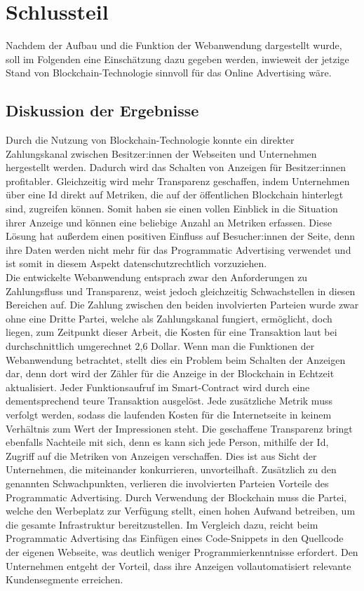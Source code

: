 \chapter{Schlussteil}
Nachdem der Aufbau und die Funktion der Webanwendung dargestellt wurde, soll im Folgenden eine Einschätzung dazu gegeben werden, inwieweit der jetzige Stand von Blockchain-Technologie sinnvoll für das Online Advertising wäre.
\section{Diskussion der Ergebnisse}
Durch die Nutzung von Blockchain-Technologie konnte ein direkter Zahlungskanal zwischen Besitzer:innen der Webseiten und Unternehmen hergestellt werden. Dadurch wird das Schalten von Anzeigen für Besitzer:innen profitabler. Gleichzeitig wird mehr Transparenz geschaffen, indem Unternehmen über eine Id direkt auf Metriken, die auf der öffentlichen Blockchain hinterlegt sind, zugreifen können. Somit haben sie einen vollen Einblick in die Situation ihrer Anzeige und können eine beliebige Anzahl an Metriken erfassen. Diese Lösung hat außerdem einen positiven Einfluss auf Besucher:innen der Seite, denn ihre Daten werden nicht mehr für das Programmatic Advertising verwendet und ist somit in diesem Aspekt datenschutzrechtlich vorzuziehen.\\

Die entwickelte Webanwendung entsprach zwar den Anforderungen zu Zahlungsfluss und Transparenz, weist jedoch gleichzeitig Schwachstellen in diesen Bereichen auf. Die Zahlung zwischen den beiden involvierten Parteien wurde zwar ohne eine Dritte Partei, welche als Zahlungskanal fungiert, ermöglicht, doch liegen, zum Zeitpunkt dieser Arbeit, die Kosten für eine Transaktion laut \cite{etherscan_2021} bei durchschnittlich umgerechnet 2,6 Dollar. Wenn man die Funktionen der Webanwendung betrachtet, stellt dies ein Problem beim Schalten der Anzeigen dar, denn dort wird der Zähler für die Anzeige in der Blockchain in Echtzeit aktualisiert. Jeder Funktionsaufruf im Smart-Contract wird durch eine dementsprechend teure Transaktion ausgelöst. Jede zusätzliche Metrik muss verfolgt werden, sodass die laufenden Kosten für die Internetseite in keinem Verhältnis zum Wert der Impressionen steht. 
Die geschaffene Transparenz bringt ebenfalls Nachteile mit sich, denn es kann sich jede Person, mithilfe der Id, Zugriff auf die Metriken von Anzeigen verschaffen. Dies ist aus Sicht der Unternehmen, die miteinander konkurrieren, unvorteilhaft. Zusätzlich zu den genannten Schwachpunkten, verlieren die involvierten Parteien Vorteile des Programmatic Advertising. Durch Verwendung der Blockchain muss die Partei, welche den Werbeplatz zur Verfügung stellt, einen hohen Aufwand betreiben, um die gesamte Infrastruktur bereitzustellen. Im Vergleich dazu, reicht beim Programmatic Advertising das Einfügen eines Code-Snippets in den Quellcode der eigenen Webseite, was deutlich weniger Programmierkenntnisse erfordert. Den Unternehmen entgeht der Vorteil, dass ihre Anzeigen vollautomatisiert relevante Kundensegmente erreichen.\\

